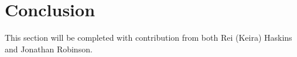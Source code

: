 \section{Conclusion}
This section will be completed with contribution from both Rei (Keira) Haskins and Jonathan Robinson.